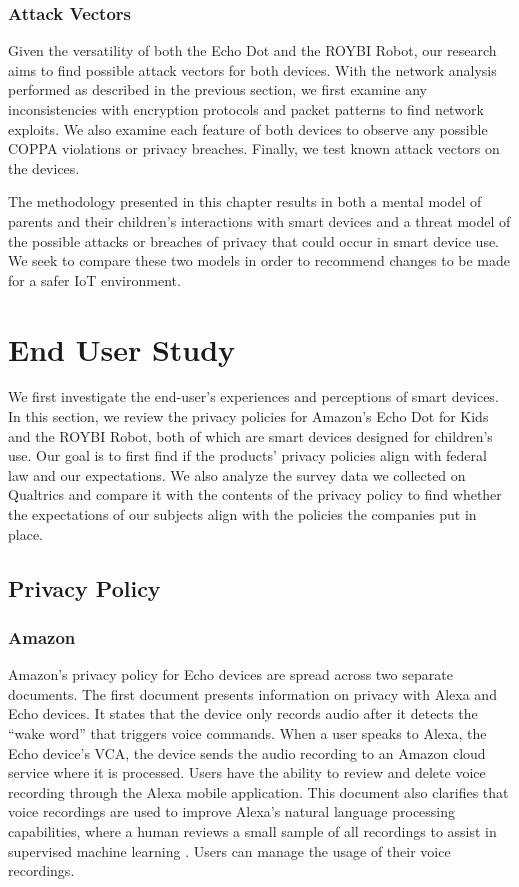 \documentclass[12pt]{ucthesis}
\begin{document}
\subsection{Attack Vectors}
Given the versatility of both the Echo Dot and the ROYBI Robot, our research aims to find possible attack vectors for both devices. With the network analysis performed as described in the previous section, we first examine any inconsistencies with encryption protocols and packet patterns to find network exploits. We also examine each feature of both devices to observe any possible COPPA violations or privacy breaches. Finally, we test known attack vectors on the devices. 

The methodology presented in this chapter results in both a mental model of parents and their children's interactions with smart devices and a threat model of the possible attacks or breaches of privacy that could occur in smart device use. We seek to compare these two models in order to recommend changes to be made for a safer IoT environment.

\chapter{End User Study}
\label{ch:mental}
We first investigate the end-user's experiences and perceptions of smart devices. In this section, we review the privacy policies for Amazon's Echo Dot for Kids and the ROYBI Robot, both of which are smart devices designed for children's use. Our goal is to first find if the products' privacy policies align with federal law and our expectations. We also analyze the survey data we collected on Qualtrics and compare it with the contents of the privacy policy to find whether the expectations of our subjects align with the policies the companies put in place.

\section{Privacy Policy}
\subsection{Amazon}
Amazon's privacy policy for Echo devices are spread across two separate documents. The first document presents information on privacy with Alexa and Echo devices. It states that the device only records audio after it detects the ``wake word'' that triggers voice commands. When a user speaks to Alexa, the Echo device's VCA, the device sends the audio recording to an Amazon cloud service where it is processed. Users have the ability to review and delete voice recording through the Alexa mobile application. This document also clarifies that voice recordings are used to improve Alexa's natural language processing capabilities, where a human reviews a small sample of all recordings to assist in supervised machine learning \cite{supervised}. Users can manage the usage of their voice recordings.
\end{document}
